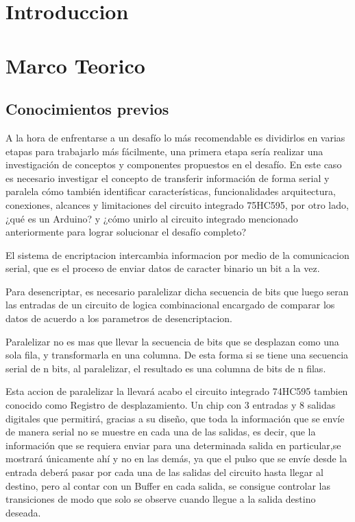 \documentclass{article}
\begin{document}
\section{Introduccion}\label{intro}
\section{Marco Teorico}\label{marco}

\subsection{Conocimientos previos}

A la hora de enfrentarse a un desafío lo más recomendable es dividirlos en varias etapas para trabajarlo más fácilmente, una primera etapa sería realizar una investigación de conceptos y componentes propuestos en el desafío. En este caso es necesario investigar el concepto de transferir información de forma serial y paralela cómo también identificar características, funcionalidades arquitectura, conexiones, alcances y limitaciones del circuito integrado 75HC595, por otro lado, ¿qué es un Arduino? y ¿cómo unirlo al circuito integrado mencionado anteriormente para lograr solucionar el desafío completo?

El sistema de encriptacion intercambia informacion por medio de la comunicacion serial, que es el proceso de enviar datos de caracter binario un bit a la vez.

Para desencriptar, es necesario paralelizar dicha secuencia de bits que luego seran las entradas de un circuito de logica combinacional encargado de comparar los datos de acuerdo a los parametros de desencriptacion.

Paralelizar no es mas que llevar la secuencia de bits que se desplazan como una sola fila, y transformarla en una columna. De esta forma si se tiene una secuencia serial de n bits, al paralelizar, el resultado es una columna de bits de n filas.

Esta accion de paralelizar la llevará acabo el circuito integrado 74HC595 tambien conocido como Registro de desplazamiento. Un chip con 3 entradas y 8 salidas digitales que permitirá, gracias a su diseño, que toda la información que se envíe de manera serial no se muestre en cada una de las salidas, es decir, que la información que se requiera enviar para una determinada salida en particular,se mostrará únicamente ahí y no en las demás, ya que el pulso que se envíe desde la entrada deberá pasar por cada una de las salidas del circuito hasta llegar al destino, pero al contar con un Buffer en cada salida, se consigue controlar las transiciones de modo que solo se observe cuando llegue a la salida destino deseada.
\end{document}
